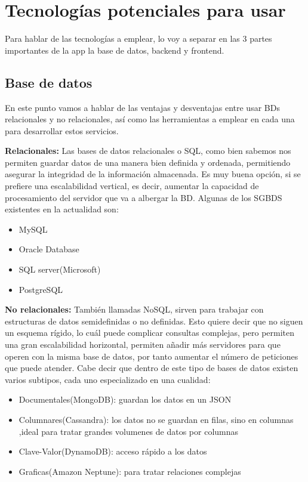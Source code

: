 \section{Tecnologías potenciales para usar}

Para hablar de las tecnologías a emplear, lo voy a separar en las 3 partes importantes de la app la base de datos, backend y frontend.

\subsection{Base de datos}

En este punto vamos a hablar de las ventajas y desventajas entre usar BDs relacionales y no relacionales, así como las herramientas a emplear en cada una para desarrollar estos servicios.

\textbf{Relacionales:} Las bases de datos relacionales o SQL, como bien sabemos nos permiten guardar datos de una manera bien definida y ordenada, permitiendo asegurar la integridad de la información almacenada. Es muy buena opción, si se prefiere una escalabilidad vertical, es decir, aumentar la capacidad de procesamiento del servidor que va a albergar la BD. Algunas de los SGBDS existentes en la actualidad son:

\begin{itemize}
	\item MySQL
	\item Oracle Database
	\item SQL server(Microsoft)
	\item PostgreSQL
\end{itemize}

\textbf{No relacionales:} También llamadas NoSQL, sirven para trabajar con estructuras de datos semidefinidas o no definidas. Esto quiere decir que no siguen un esquema rígido, lo cuál puede complicar consultas complejas, pero permiten una gran escalabilidad horizontal, permiten añadir más servidores para que operen con la misma base de datos, por tanto aumentar el número de peticiones que puede atender. Cabe decir que dentro de este tipo de bases de datos existen varios subtipos, cada uno especializado en una cualidad:

\begin{itemize}
	\item Documentales(MongoDB): guardan los datos en un JSON
	\item Columnares(Cassandra): los datos no se guardan en filas, sino en columnas ,ideal para tratar grandes volumenes de datos por columnas
	\item Clave-Valor(DynamoDB): acceso rápido a los datos
	\item Graficas(Amazon Neptune): para tratar relaciones complejas
\end{itemize}

